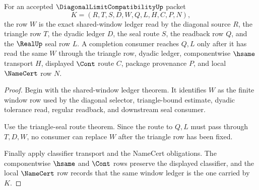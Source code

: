 \begin{theorem}
\label{thm:diagonal-limit-compatibility-window-ledger-exactness}
For an accepted $\DiagonalLimitCompatibilityUp$ packet
$$
K=(R,T,S,D,W,Q,L,H,C,P,N),
$$
the row $W$ is the exact shared-window ledger read by the diagonal source $R$, the triangle row $T$, the dyadic ledger $D$, the seal route $S$, the readback row $Q$, and the $\RealUp$ seal row $L$. A completion consumer reaches $Q,L$ only after it has read the same $W$ through the triangle row, dyadic ledger, componentwise $\hsame$ transport $H$, displayed $\Cont$ route $C$, package provenance $P$, and local $\NameCert$ row $N$.
\end{theorem}
\begin{proof}
Begin with the shared-window ledger theorem. It identifies $W$ as the finite window row used by the diagonal selector, triangle-bound estimate, dyadic tolerance read, regular readback, and downstream seal consumer.

Use the triangle-seal route theorem. Since the route to $Q,L$ must pass through $T,D,W$, no consumer can replace $W$ after the triangle row has been fixed.

Finally apply classifier transport and the NameCert obligations. The componentwise $\hsame$ and $\Cont$ rows preserve the displayed classifier, and the local $\NameCert$ row records that the same window ledger is the one carried by $K$.
\end{proof}


